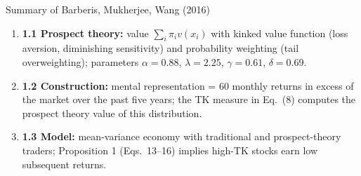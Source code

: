 \documentclass[aspectratio=169, 11pt]{beamer}
\begin{document}
\begin{frame}{Summary of Barberis, Mukherjee, Wang (2016)}
\begin{enumerate}
  \item \textbf{1.1 Prospect theory:} value $\sum_i\pi_i v(x_i)$ with kinked value function (loss aversion, diminishing sensitivity) and probability weighting (tail overweighting); parameters $\alpha=0.88$, $\lambda=2.25$, $\gamma=0.61$, $\delta=0.69$.
  \item \textbf{1.2 Construction:} mental representation = 60 monthly returns in excess of the market over the past five years; the \alert{TK} measure in Eq.~(8) computes the prospect theory value of this distribution.
  \item \textbf{1.3 Model:} mean-variance economy with traditional and prospect-theory traders; Proposition 1 (Eqs.~13--16) implies high-TK stocks earn low subsequent returns.
\end{enumerate}
\vspace{0.8em}
\end{frame}
\end{document}
